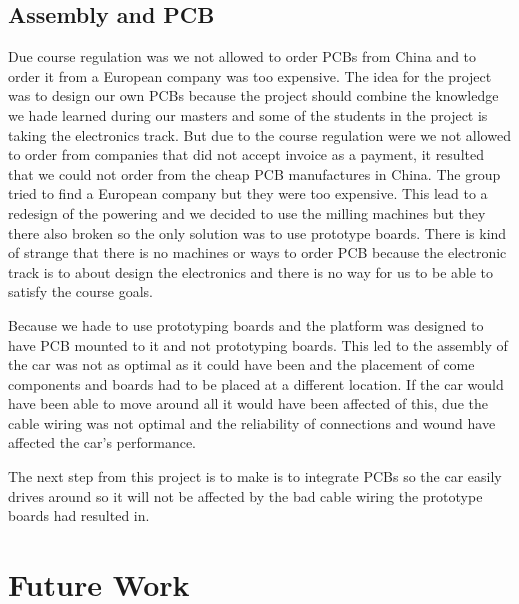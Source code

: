 \documentclass[11pt, titlepage]{article} %
\begin{document}
\subsection{Assembly and PCB}
Due course regulation was we not allowed to order PCBs from China and to order it from a European company was too expensive. 
The idea for the project was to design our own PCBs because the project should combine the knowledge we hade learned during our masters and some of the students in the project is taking the electronics track. But due to the course regulation were we not allowed to order from companies that did not accept invoice as a payment, it resulted that we could not order from the cheap PCB manufactures in China. The group tried to find a European company but they were too expensive. This lead to a redesign of the powering and we decided to use the milling machines but they there also broken so the only solution was to use prototype boards. There is kind of strange that there is no machines or ways to order PCB because the electronic track is to about design the electronics and there is no way for us to be able to satisfy the course goals. 

Because we hade to use prototyping boards and the platform was designed to have PCB mounted to it and not prototyping boards. This led to the assembly of the car was not as optimal as it could have been and the placement of come components and boards had to be placed at a different location. If the car would have been able to move around all it would have been affected of this, due the cable wiring was not optimal and the reliability of connections and wound have affected the car's performance. 

The next step from this project is to make is to integrate PCBs so the car easily drives around so it will not be affected by the bad cable wiring the prototype boards had resulted in. 


\clearpage
\section{Future Work}
\clearpage




\clearpage
\clearpage
\appendix
\clearpage
\end{document}
